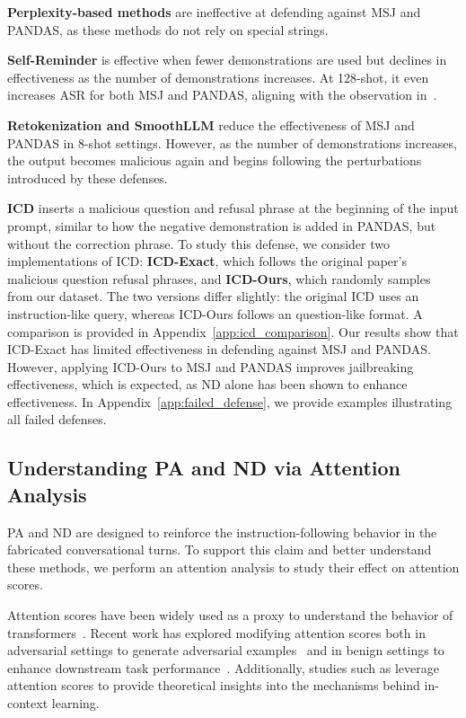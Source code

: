 \textbf{Perplexity-based methods} are ineffective at defending against MSJ and PANDAS, as these methods do not rely on special strings.

\textbf{Self-Reminder} is effective when fewer demonstrations are used but declines in effectiveness as the number of demonstrations increases. At 128-shot, it even increases ASR for both MSJ and PANDAS, aligning with the observation in~\citet{zheng2024improved}.

\textbf{Retokenization and SmoothLLM} reduce the effectiveness of MSJ and PANDAS in 8-shot settings. However, as the number of demonstrations increases, the output becomes malicious again and begins following the perturbations introduced by these defenses.

\textbf{ICD} inserts a malicious question and refusal phrase at the beginning of the input prompt, similar to how the negative demonstration is added in PANDAS, but without the correction phrase. To study this defense, we consider two implementations of ICD: \textbf{ICD-Exact}, which follows the original paper’s malicious question refusal phrases, and \textbf{ICD-Ours}, which randomly samples from our dataset. The two versions differ slightly: the original ICD uses an instruction-like query, whereas ICD-Ours follows an question-like format. 
A comparison is provided in Appendix~\ref{app:icd_comparison}. Our results show that ICD-Exact has limited effectiveness in defending against MSJ and PANDAS. However, applying ICD-Ours to MSJ and PANDAS improves jailbreaking effectiveness, which is expected, as ND alone has been shown to enhance effectiveness. In Appendix~\ref{app:failed_defense}, we provide examples illustrating all failed defenses.


\subsection{Understanding PA and ND via Attention Analysis}
PA and ND are designed to reinforce the instruction-following behavior in the fabricated conversational turns. To support this claim and better understand these methods, we perform an attention analysis to study their effect on attention scores.

Attention scores have been widely used as a proxy to understand the behavior of transformers~\citep{clark2019does, hao2021self, oymak2023role, quirke2023understanding}. Recent work has explored modifying attention scores both in adversarial settings to generate adversarial examples~\citep{lyu2023attention} and in benign settings to enhance downstream task performance~\citep{zhang2023tell}. Additionally, studies such as \citet{akyurek2022learning} leverage attention scores to provide theoretical insights into the mechanisms behind in-context learning.

